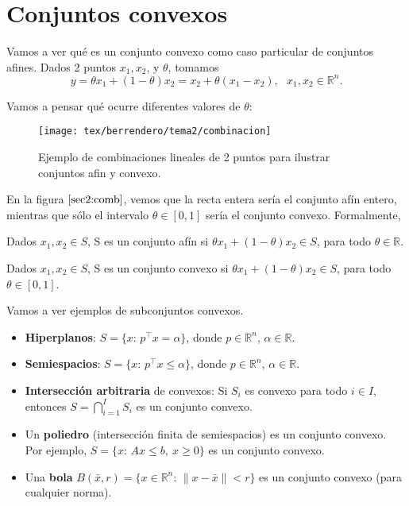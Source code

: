 
\section{Conjuntos convexos}

Vamos a ver qué es un conjunto convexo como caso particular de conjuntos afines.  
Dados 2 puntos $x_1,x_2$, y $\theta$, tomamos 
\[
y = \theta x_1 + (1-\theta)x_2 = x_2 + \theta (x_1-x_2),\ \ \  x_1,x_2\in\mathbb{R}^n.
\]

Vamos a pensar qué ocurre diferentes valores de $\theta$:


\begin{figure}
\begin{center}
\texttt{[image: tex/berrendero/tema2/combinacion]}
\caption{Ejemplo de combinaciones lineales de 2 puntos para ilustrar conjuntos afin y convexo.}
\label{sec2:comb}
\end{center}
\end{figure}


En la figura $\ref{sec2:comb}$, vemos que la recta entera sería el conjunto afín entero, mientras que sólo el intervalo $\theta \in [0,1]$ sería el conjunto convexo. Formalmente,

\begin{defn}
Dados $x_1,x_2\in S$, S es un conjunto afín si $\theta x_1 + (1-\theta)x_2\in S$, para todo $\theta\in \mathbb{R}$.
\end{defn}

\begin{defn}
Dados $x_1,x_2\in S$, S es un conjunto convexo si $\theta x_1 + (1-\theta)x_2\in S$, para todo $\theta\in [0,1]$.
\end{defn}





Vamos a ver ejemplos de subconjuntos convexos.
\begin{itemize}
\item \textbf{Hiperplanos}: $S=\{x:\, p^\top x = \alpha\}$, donde $p\in\mathbb{R}^n$, $\alpha\in\mathbb{R}$. 

\item \textbf{Semiespacios}: $S=\{x:\, p^\top x \leq \alpha\}$, donde $p\in\mathbb{R}^n$, $\alpha\in\mathbb{R}$. 

\item \textbf{Intersección arbitraria} de convexos: Si $S_i$ es convexo para todo $i\in I$, entonces $S=\bigcap_{i=1}^I S_i$ es un conjunto convexo.

\item Un \textbf{poliedro} (intersección finita de semiespacios) es un conjunto convexo. Por ejemplo, $S=\{x:\, Ax\leq b,\ x\geq 0\}$ es un conjunto convexo.

\item Una \textbf{bola} $B(\bar x,r)=\{x\in\mathbb{R}^n:\, \|x-\bar x\|<r\}$ es un conjunto convexo (para cualquier norma).

\end{itemize}




